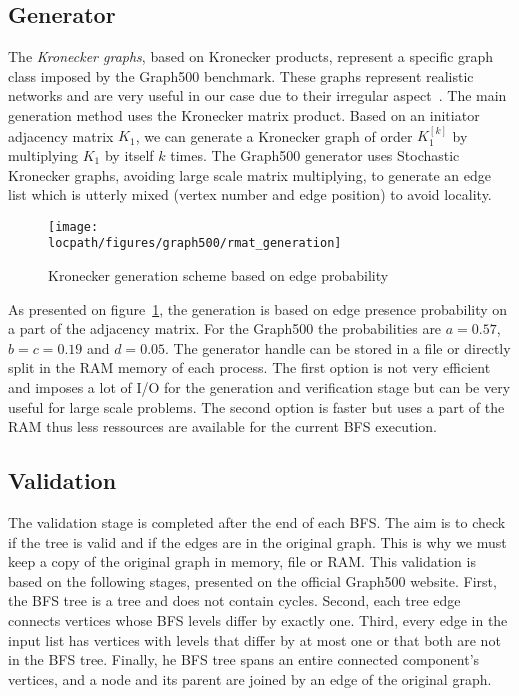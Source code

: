 \subsection{Generator}

The \textit{Kronecker graphs}, based on Kronecker products, represent a specific graph class
imposed by the Graph500 benchmark. 
These graphs represent realistic networks and are very useful in our case due to their irregular aspect~\cite{leskovec2010kronecker}. 
The main generation method uses the Kronecker matrix product. 
Based on an initiator adjacency matrix $K_1$, we can generate a Kronecker graph of order $K_1^{[k]}$ by multiplying $K_1$ by itself $k$ times. 
The Graph500 generator uses Stochastic Kronecker graphs, avoiding large scale matrix multiplying, to generate an edge list which is utterly mixed (vertex number and edge position) to avoid locality. 

\begin{figure}[!t]
	\centering
	\texttt{[image: \\locpath/figures/graph500/rmat\_generation]}
	\caption{Kronecker generation scheme based on edge probability}
	\label{fig:kron_gen_scheme}
\end{figure}

As presented on figure~\ref{fig:kron_gen_scheme}, the generation is based on edge presence probability on a part of the adjacency matrix. 
For the Graph500 the probabilities are $a = 0.57$, $b = c = 0.19$ and $d = 0.05$.
The generator handle can be stored in a file or directly split in the RAM memory of each process. 
The first option is not very efficient and imposes a lot of I/O for the generation and verification stage but can be very useful for large scale problems.
The second option is faster but uses a part of the RAM thus less ressources are available for the current BFS execution.


\subsection{Validation}
The validation stage is completed after the end of each BFS. 
The aim is to check if the tree is valid and if the edges are in the original graph.
 This is why we must keep a copy of the original graph in memory, file or RAM. 
This validation is based on the following stages, presented on the official Graph500 website.
First, the BFS tree is a tree and does not contain cycles.
Second, each tree edge connects vertices whose BFS levels differ by exactly one.
Third, every edge in the input list has vertices with levels that differ by at most one or that both are not in the BFS tree.
Finally, he BFS tree spans an entire connected component's vertices, and
a node and its parent are joined by an edge of the original graph.

